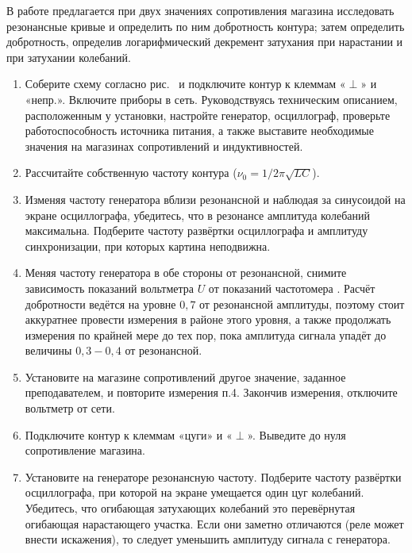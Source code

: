 \begin{lab:task}

В работе предлагается при двух значениях сопротивления магазина
исследовать резонансные кривые и определить по ним добротность контура;
затем определить добротность, определив логарифмический декремент
затухания при нарастании и при затухании колебаний.

	\begin{enumerate}

	\item Соберите схему согласно рис.~ и подключите контур к клеммам «$\perp$» и
«непр.». Включите приборы в сеть. Руководствуясь техническим описанием,
расположенным у установки, настройте генератор, осциллограф, проверьте
работоспособность источника питания, а также выставите необходимые
значения на магазинах сопротивлений и индуктивностей.


	\item Рассчитайте собственную частоту контура
($\nu_{0} = 1/2\pi\sqrt{LC}$).

	\item Изменяя частоту генератора вблизи резонансной и наблюдая за
синусоидой на экране осциллографа, убедитесь, что в резонансе амплитуда
колебаний максимальна. Подберите частоту развёртки осциллографа и
амплитуду синхронизации, при которых картина неподвижна.

	\item Меняя частоту генератора в обе стороны от резонансной, снимите
зависимость показаний вольтметра $U$ от показаний частотомера
\nu. Расчёт добротности ведётся на уровне $0,7$ от резонансной
амплитуды, поэтому стоит аккуратнее провести измерения в районе этого
уровня, а также продолжать измерения по крайней мере до тех пор, пока
амплитуда сигнала упадёт до величины $0,3 - 0,4$ от резонансной.

	\item Установите на магазине сопротивлений другое значение, заданное
преподавателем, и повторите измерения п.4. Закончив измерения, отключите
вольтметр от сети.


	\item Подключите контур к клеммам «цуги» и «$\perp$». Выведите до нуля
сопротивление магазина.

	\item Установите на генераторе резонансную частоту. Подберите частоту
развёртки осциллографа, при которой на экране умещается один цуг
колебаний. Убедитесь, что огибающая затухающих колебаний это
перевёрнутая огибающая нарастающего участка. Если они заметно отличаются
(реле может внести искажения), то следует уменьшить амплитуду сигнала с
генератора.


\end{enumerate}
\end{lab:task}
